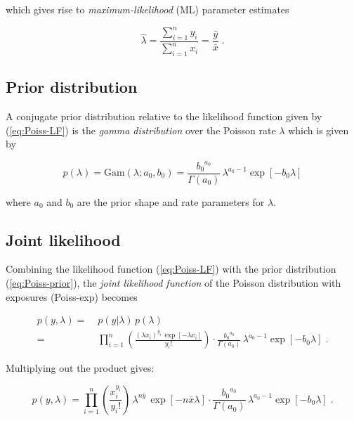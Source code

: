 which gives rise to \textit{maximum-likelihood} (ML) parameter estimates

\begin{equation} \label{eq:Poiss-MLE}
\hat{\lambda} = \frac{\sum_{i=1}^n y_i}{\sum_{i=1}^n x_i} = \frac{\bar{y}}{\bar{x}} \; .
\end{equation}


\subsection{Prior distribution} \label{sec:Poiss-prior}

A conjugate prior distribution relative to the likelihood function given by (\ref{eq:Poiss-LF}) is the \textit{gamma distribution} over the Poisson rate $\lambda$ which is given by

\begin{equation} \label{eq:Poiss-prior}
p(\lambda) = \mathrm{Gam}(\lambda; a_0, b_0) = \frac{{b_0}^{a_0}}{\Gamma(a_0)} \, \lambda^{a_0-1} \exp[-b_0 \lambda]
\end{equation}

where $a_0$ and $b_0$ are the prior shape and rate parameters for $\lambda$.


\subsection{Joint likelihood} \label{sec:Poiss-JL}

Combining the likelihood function (\ref{eq:Poiss-LF}) with the prior distribution (\ref{eq:Poiss-prior}), the \textit{joint likelihood function} of the Poisson distribution with exposures (Poiss-exp) becomes

\vspace{-0.5em}
\begin{equation} \label{eq:Poiss-JL1}
\begin{split}
p(y,\lambda) = \; & p(y|\lambda) \, p(\lambda) \\
= \; & \prod_{i=1}^n \left( \frac{(\lambda x_i)^{y_i} \, \exp[-\lambda x_i]}{y_i !} \right) \cdot \frac{{b_0}^{a_0}}{\Gamma(a_0)} \, \lambda^{a_0-1} \exp[-b_0 \lambda] \; .
\end{split}
\end{equation}

Multiplying out the product gives:

\begin{equation} \label{eq:Poiss-JL2}
p(y,\lambda) = \prod_{i=1}^n \left( \frac{x_i^{y_i}}{y_i !} \right) \, \lambda^{n \bar{y}} \, \exp[-n \bar{x} \lambda] \cdot \frac{{b_0}^{a_0}}{\Gamma(a_0)} \, \lambda^{a_0-1} \exp[-b_0 \lambda] \; .
\end{equation}

